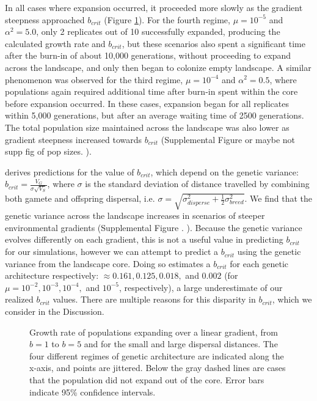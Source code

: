 In all cases where expansion occurred, it proceeded more slowly as the gradient steepness approached $b_{crit}$ (Figure \ref{fig:linearspeed}). For the fourth regime, $\mu = 10^{-5}$ and $\alpha^2 = 5.0$, only 2 replicates out of 10 successfully expanded, producing the calculated growth rate and $b_{crit}$, but these scenarios also spent a significant time after the burn-in of \color{red}about 10,000 \color{clack} generations, without proceeding to expand across the landscape, and only then began to colonize empty landscape. A similar phenomenon was observed for the third regime, $\mu = 10^{-4}$ and $\alpha^2 = 0.5$, where populations again required additional time after burn-in spent within the core before expansion occurred. In these cases, expansion began for all replicates within \color{red}5,000 \color{black} generations, but after an average waiting time of \color{red}2500 \color{black} generations. The total population size maintained across the landscape was also lower as gradient steepness increased towards $b_{crit}$ (\color{red}Supplemental Figure or maybe not supp fig of pop sizes.\color{black} ). 

\citet{Barton:2001} derives predictions for the value of $b_{crit}$, which depend on the genetic variance: $b_{crit} = \frac{V_G}{\sigma \sqrt{V_S}}$, where $\sigma$ is the standard deviation of distance travelled by combining both gamete and offspring dispersal, i.e. $\sigma = \sqrt{\sigma_{disperse}^2 + \frac{1}{2}\sigma_{breed}^2}$. We find that the genetic variance across the landscape increases in scenarios of steeper environmental gradients (Supplemental Figure . ). Because the genetic variance evolves differently on each gradient, this is not a useful value in predicting $b_{crit}$ for our simulations, however we can attempt to predict a $b_{crit}$ using the genetic variance from the landscape core. Doing so estimates a $b_{crit}$ for each genetic architecture respectively: $\approx 0.161, 0.125, 0.018,$ and $0.002$ (for $\mu = 10^{-2}, 10^{-3}, 10^{-4},$ and $10^{-5}$, respectively), a large underestimate of our realized $b_{crit}$ values. There are multiple reasons for this disparity in $b_{crit}$, which we consider in the Discussion.

\begin{figure}[h]
\centering
{}
\caption[Growth rate of populations expanding over a linear gradient.]{Growth rate of populations expanding over a linear gradient, from $b = 1$ to $b = 5$ and for the small and large dispersal distances. The four different regimes of genetic architecture are indicated along the x-axis, and points are jittered. Below the gray dashed lines are cases that the population did not expand out of the core. Error bars indicate 95\% confidence intervals.}
\label{fig:linearspeed}
\end{figure}

